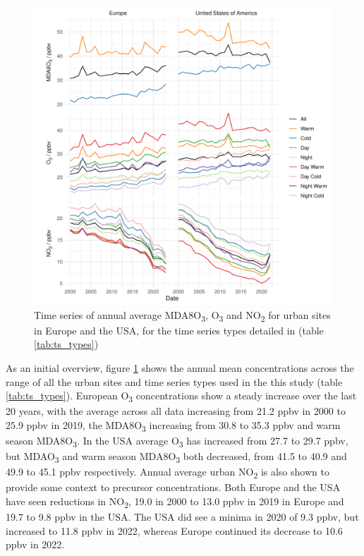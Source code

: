 \documentclass[journal abbreviation, manuscript]{copernicus}
\begin{document}
\begin{figure}[t]
\includegraphics[width=12cm]{figures/paper_figures/f2.pdf}
\caption{Time series of annual average MDA8O\textsubscript{3}, O\textsubscript{3} and NO\textsubscript{2} for urban sites in Europe and the USA, for the time series types detailed in (table \ref{tab:ts_types})}
\label{fig:conc_plot}
\end{figure}

As an initial overview, figure \ref{fig:conc_plot} shows the annual mean concentrations across the range of all the urban sites and time series types used in the this study (table \ref{tab:ts_types}). European O\textsubscript{3} concentrations show a steady increase over the last 20 years, with the average across all data increasing from 21.2 ppbv in 2000 to 25.9 ppbv in 2019, the MDA8O\textsubscript{3} increasing from 30.8 to 35.3 ppbv and warm season MDA8O\textsubscript{3}. In the USA average O\textsubscript{3} has increased from 27.7 to 29.7 ppbv, but MDAO\textsubscript{3} and warm season MDA8O\textsubscript{3} both decreased, from 41.5 to 40.9 and 49.9 to 45.1 ppbv respectively. Annual average urban NO\textsubscript{2} is also shown to provide some context to precursor concentrations. Both Europe and the USA have seen reductions in NO\textsubscript{2}, 19.0 in 2000 to 13.0 ppbv in 2019 in Europe and 19.7 to 9.8 ppbv in the USA. The USA did see a minima in 2020 of 9.3 ppbv, but increased to 11.8 ppbv in 2022, whereas Europe continued its decrease to 10.6 ppbv in 2022. 
\end{document}
